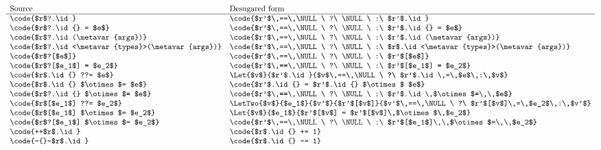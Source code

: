 \documentclass[makeidx]{article}
\begin{document}
{\begin{figure}[t]
  \begin{minipage}[h]{\textwidth}
    \begin{displaymath}
      \begin{array}{ll}
        \mbox{Source} & \mbox{Desugared form} \\
        \hline
        \code{$r$?.\id} &
        \code{$r'$\,==\,\NULL\ ?\ \NULL\ :\ $r'$.\id}
        \\
        \code{$r$?.\id{} = $e$} &
        \code{$r'$\,==\,\NULL\ ?\ \NULL\ :\ $r'$.\id{} = $e$}
        \\
        \code{$r$?.\id(\metavar{args})} &
        \code{$r'$\,==\,\NULL\ ?\ \NULL\ :\ $r'$.\id(\metavar{args})}
        \\
        \code{$r$?.\id<\metavar{types}>(\metavar{args})} &
        \code{$r'$\,==\,\NULL\ ?\ \NULL\ :\ $r$.\id<\metavar{types}>(\metavar{args})}
        \\
        \code{$r$?[$e$]} &
        \code{$r'$\,==\,\NULL\ ?\ \NULL\ :\ $r'$[$e$]}
        \\
        \code{$r$?[$e_1$] = $e_2$} &
        \code{$r'$\,==\,\NULL\ ?\ \NULL\ :\ $r'$[$e_1$] = $e_2$}
        \\
        \code{$r$.\id{} ??= $e$} &
        \Let{$v$}{$r'$.\id}{$v$\,==\,\NULL\ ?\ $r'$.\id\,=\,$e$\,:\,$v$}
        \\
        \code{$r$.\id{} $\otimes$= $e$} &
        \code{$r'$.\id{} = $r'$.\id{} $\otimes$ $e$}
        \\
        \code{$r$?.\id{} $\otimes$= $e$} &
        \code{$r'$\,==\,\NULL\ ?\ \NULL\ :\ $r'$.\id\,$\otimes$=\,\,$e$}
        \\
        \code{$r$[$e_1$] ??= $e_2$} &
        \LetTwo{$v$}{$e_1$}{$v'$}{$r'$[$v$]}{%
          $v'$\,==\,\NULL\ ?\ $r'$[$v$]\,=\,$e_2$\,:\,$v'$}
        \\
        \code{$r$[$e_1$] $\otimes$= $e_2$} &
        \Let{$v$}{$e_1$}{$r'$[$v$] = $r'$[$v$]\,$\otimes$\,$e_2$}
        \\
        \code{$r$?[$e_1$] $\otimes$= $e_2$} &
        \code{$r'$\,==\,\NULL\ ?\ \NULL\ :\ $r'$[$e_1$]\,\,$\otimes$=\,\,$e_2$}
        \\
        \code{++$r$.\id} &
        \code{$r$.\id{} += 1}
        \\
        \code{-{}-$r$.\id} &
        \code{$r$.\id{} -= 1}
        \\

\end{array}
\end{displaymath}
\end{minipage}
\end{figure}}
\end{document}

